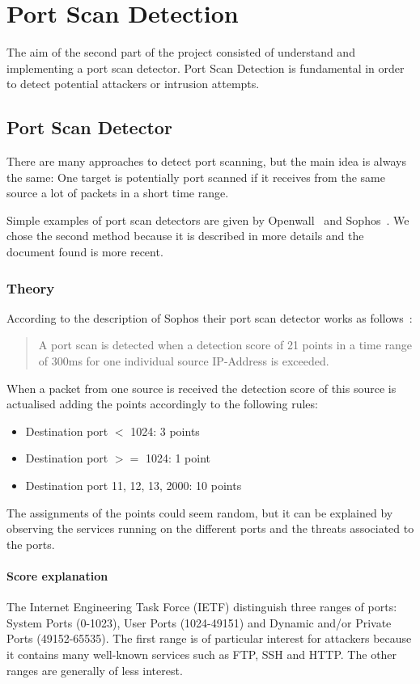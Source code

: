 \chapter{Port Scan Detection}
\label{sec:detector}
The aim of the second part of the project consisted of understand and implementing
a port scan detector. Port Scan Detection is fundamental in order
to detect potential attackers or intrusion attempts.

\section{Port Scan Detector}
There are many approaches to detect port scanning, but the main idea
is always the same: One target is potentially port scanned if it receives
from the same source a lot of packets in a short time range.

Simple examples of port scan detectors are given by 
Openwall~\cite{scanlogd} and
Sophos~\cite{sophos}.
We chose the second method because it is described in more details and the document found
is more recent.
\subsection{Theory}
According to the description of Sophos their port scan detector works as follows~\cite{sophos}:
\begin{quote}
	A port scan is detected when a detection score of 21 points
	in a time range of 300ms for one individual source IP-Address is exceeded.
\end{quote}
When a packet from one source is received the detection score of this source
is actualised adding the points accordingly to the following rules:
\begin{itemize}
	\item Destination port $<$ 1024: 3 points
	\item Destination port $>=$ 1024: 1 point
	\item Destination port 11, 12, 13, 2000: 10 points
\end{itemize}
The assignments of the points could seem random, but it can be explained by observing the services running on the different ports and the threats associated to the ports.
\subsubsection{Score explanation}
The Internet Engineering Task Force (IETF) distinguish three ranges of ports: System Ports (0-1023), 
User Ports (1024-49151) and Dynamic and/or Private Ports (49152-65535).
The first range is of particular interest for attackers because it contains many well-known services such as FTP, SSH and HTTP.
The other ranges are generally of less interest.

